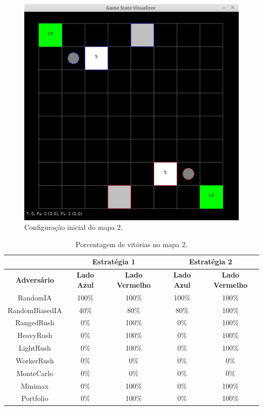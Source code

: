 \begin{figure}[ht]
	\centering
	\includegraphics[width=.6\textwidth]{fig/map8x8quartel.pdf}
	\caption{Configuração inicial do mapa 2.}
	\label{fig:mapa8x8quartel}
\end{figure}

\begin{table}[ht]
	\centering
	\caption{Porcentagem de vitórias no mapa 2.}
	\label{tab:mapa2}
	\begin{tabular}{|c|cc|cc|}
		\hline
		\textbf{}           & \multicolumn{2}{c|}{\textbf{Estratégia 1}}  & \multicolumn{2}{c|}{\textbf{Estratégia 2}}  \\ \hline
		\textbf{Adversário} & \textbf{Lado Azul} & \textbf{Lado Vermelho} & \textbf{Lado Azul} & \textbf{Lado Vermelho} \\ \hline
		RandomIA            & 100\%              & 100\%                  & 100\%              & 100\%                  \\ \hline
		RandomBiasedIA      & 40\%               & 80\%                   & 80\%               & 100\%                  \\ \hline
		RangedRush          & 0\%                & 100\%                  & 0\%                & 100\%                  \\ \hline
		HeavyRush           & 0\%                & 100\%                  & 0\%                & 100\%                  \\ \hline
		LightRush           & 0\%                & 100\%                  & 0\%                & 100\%                  \\ \hline
		WorkerRush          & 0\%                & 0\%                    & 0\%                & 0\%                    \\ \hline
		MonteCarlo          & 0\%                & 0\%                    & 0\%                & 0\%                    \\ \hline
		Minimax             & 0\%                & 100\%                  & 0\%                & 100\%                  \\ \hline
		Portfolio           & 0\%                & 100\%                  & 0\%                & 100\%                  \\ \hline
	\end{tabular}
\end{table}

